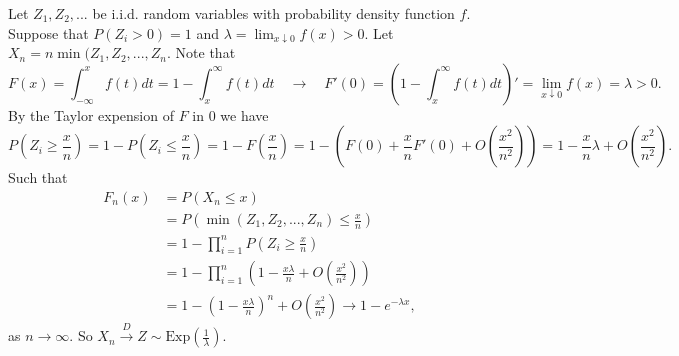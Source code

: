 Let $Z_1, Z_2, ...$ be i.i.d. random variables with probability density function $f$.
Suppose that $P(Z_i > 0) = 1$ and $\lambda = \lim_{x \downarrow 0} f(x) > 0$.
Let $X_n = n \min(Z_1, Z_2, ..., Z_n$.
Note that
\begin{equation*}
    F(x) = \int_{-\infty}^{x} f(t) dt
        = 1 - \int_{x}^{\infty} f(t) dt
        \quad \rightarrow \quad
    F'(0) = \left( 1 - \int_{x}^{\infty} f(t) dt \right)'
        = \lim_{x \downarrow 0} f(x)
        = \lambda > 0.
\end{equation*}
By the Taylor expension of $F$ in $0$ we have
\begin{equation*}
    P(Z_i \geq \frac{x}{n}) = 1 - P(Z_i \leq \frac{x}{n})
        = 1 - F(\frac{x}{n})
        = 1 - (F(0) + \frac{x}{n} F'(0) + O(\frac{x^2}{n^2}))
        = 1 - \frac{x}{n} \lambda + O(\frac{x^2}{n^2}).
\end{equation*}
Such that
\begin{equation*}
    \begin{split}
        F_n(x)
            &= P\left(X_n \leq x\right) \\
            &= P\left(\min(Z_1, Z_2, ..., Z_n) \leq \frac{x}{n}\right) \\
            &= 1 - \prod_{i = 1}^n P\left(Z_i \geq \frac{x}{n}\right) \\
            &= 1 - \prod_{i = 1}^n \left(1 - \frac{x \lambda}{n} + O(\frac{x^2}{n^2})\right) \\
            &= 1 - \left(1 - \frac{x \lambda}{n}\right)^n + O\left(\frac{x^2}{n^2}\right)
            \to 1 - e^{-\lambda x},
    \end{split}
\end{equation*}
as $n \to \infty$.
So $X_n \xrightarrow{D} Z \sim \mathrm{Exp}(\frac{1}{\lambda})$.
